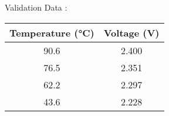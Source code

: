 \documentclass[journal,12pt,onecolumn]{IEEEtran}
\author{EE25BTECH11018 , EE25BTECH11061}
\begin{document}
\maketitle
\begin{center}
Validation Data : \\
\begin{tabular}{ |c|c| }
    \hline
    \textbf{Temperature (°C)} & \textbf{Voltage (V)} \\
    \hline
    90.6 & 2.400 \\
    \hline
    76.5 & 2.351 \\
    \hline
    62.2 & 2.297 \\
    \hline
    43.6 & 2.228 \\
    \hline
\end{tabular}
\end{center}
\end{document}

